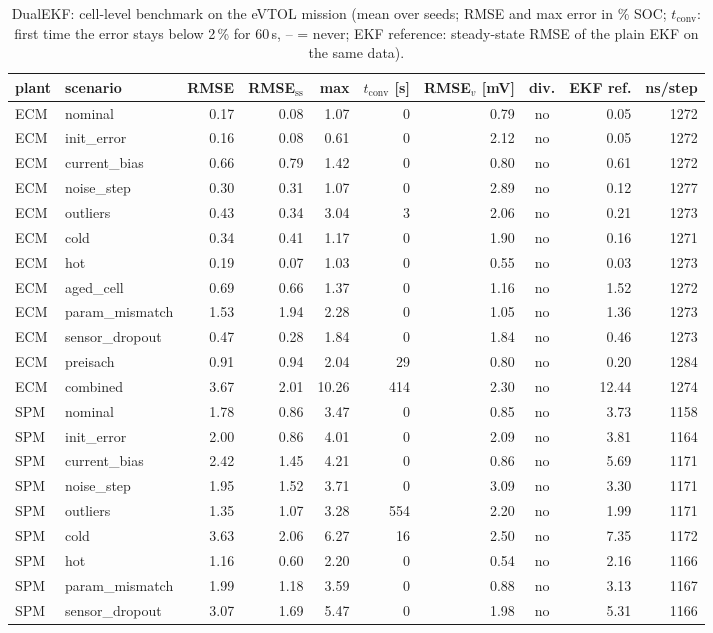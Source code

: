 \begin{table}[H]\centering\footnotesize\setlength{\tabcolsep}{4pt}
\caption{DualEKF: cell-level benchmark on the eVTOL mission (mean over seeds; RMSE and max error in \% SOC; $t_\mathrm{conv}$: first time the error stays below 2\,\% for 60\,s, -- = never; EKF reference: steady-state RMSE of the plain EKF on the same data).}\label{tab:cell_DualEKF}
\begin{tabular}{llrrrrrcrr}\toprule
plant & scenario & RMSE & RMSE$_\mathrm{ss}$ & max & $t_\mathrm{conv}$ [s] & RMSE$_v$ [mV] & div. & EKF ref. & ns/step \\ \midrule
ECM & nominal & 0.17 & 0.08 & 1.07 & 0 & 0.79 & no & 0.05 & 1272 \\
ECM & init\_error & 0.16 & 0.08 & 0.61 & 0 & 2.12 & no & 0.05 & 1272 \\
ECM & current\_bias & 0.66 & 0.79 & 1.42 & 0 & 0.80 & no & 0.61 & 1272 \\
ECM & noise\_step & 0.30 & 0.31 & 1.07 & 0 & 2.89 & no & 0.12 & 1277 \\
ECM & outliers & 0.43 & 0.34 & 3.04 & 3 & 2.06 & no & 0.21 & 1273 \\
ECM & cold & 0.34 & 0.41 & 1.17 & 0 & 1.90 & no & 0.16 & 1271 \\
ECM & hot & 0.19 & 0.07 & 1.03 & 0 & 0.55 & no & 0.03 & 1273 \\
ECM & aged\_cell & 0.69 & 0.66 & 1.37 & 0 & 1.16 & no & 1.52 & 1272 \\
ECM & param\_mismatch & 1.53 & 1.94 & 2.28 & 0 & 1.05 & no & 1.36 & 1273 \\
ECM & sensor\_dropout & 0.47 & 0.28 & 1.84 & 0 & 1.84 & no & 0.46 & 1273 \\
ECM & preisach & 0.91 & 0.94 & 2.04 & 29 & 0.80 & no & 0.20 & 1284 \\
ECM & combined & 3.67 & 2.01 & 10.26 & 414 & 2.30 & no & 12.44 & 1274 \\
\midrule
SPM & nominal & 1.78 & 0.86 & 3.47 & 0 & 0.85 & no & 3.73 & 1158 \\
SPM & init\_error & 2.00 & 0.86 & 4.01 & 0 & 2.09 & no & 3.81 & 1164 \\
SPM & current\_bias & 2.42 & 1.45 & 4.21 & 0 & 0.86 & no & 5.69 & 1171 \\
SPM & noise\_step & 1.95 & 1.52 & 3.71 & 0 & 3.09 & no & 3.30 & 1171 \\
SPM & outliers & 1.35 & 1.07 & 3.28 & 554 & 2.20 & no & 1.99 & 1171 \\
SPM & cold & 3.63 & 2.06 & 6.27 & 16 & 2.50 & no & 7.35 & 1172 \\
SPM & hot & 1.16 & 0.60 & 2.20 & 0 & 0.54 & no & 2.16 & 1166 \\
SPM & param\_mismatch & 1.99 & 1.18 & 3.59 & 0 & 0.88 & no & 3.13 & 1167 \\
SPM & sensor\_dropout & 3.07 & 1.69 & 5.47 & 0 & 1.98 & no & 5.31 & 1166 \\
\bottomrule\end{tabular}\end{table}
